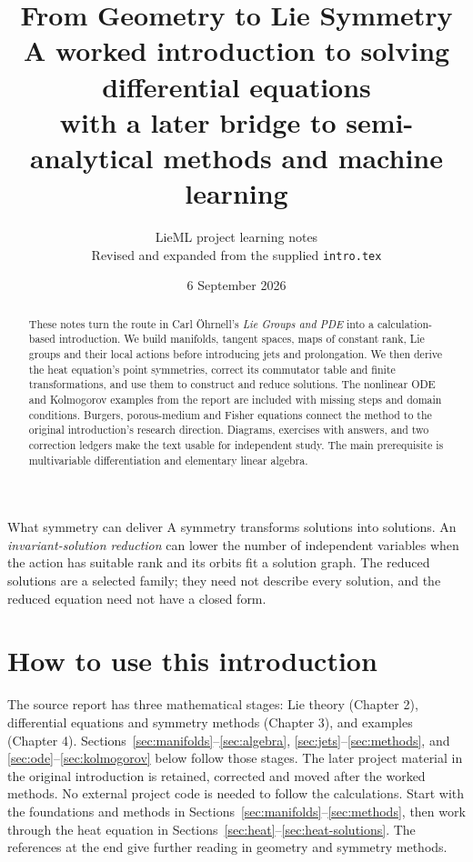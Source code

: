 \documentclass[11pt,a4paper]{article}
\title{\color{ink}\bfseries From Geometry to Lie Symmetry\\[5pt]\Large A worked introduction to solving differential equations\\[7pt]\large with a later bridge to semi-analytical methods and machine learning}
\author{LieML project learning notes\\\small Revised and expanded from the supplied \texttt{intro.tex}}
\date{6 September 2026}
\numberwithin{equation}{section}
\theoremstyle{definition}
\theoremstyle{plain}
\theoremstyle{remark}
\begin{document}
\maketitle
\begin{abstract}
These notes turn the route in Carl \"Ohrnell's \emph{Lie Groups and PDE} into a calculation-based introduction. We build manifolds, tangent spaces, maps of constant rank, Lie groups and their local actions before introducing jets and prolongation. We then derive the heat equation's point symmetries, correct its commutator table and finite transformations, and use them to construct and reduce solutions. The nonlinear ODE and Kolmogorov examples from the report are included with missing steps and domain conditions. Burgers, porous-medium and Fisher equations connect the method to the original introduction's research direction. Diagrams, exercises with answers, and two correction ledgers make the text usable for independent study. The main prerequisite is multivariable differentiation and elementary linear algebra.
\end{abstract}
\begin{idea}{What symmetry can deliver}
A symmetry transforms solutions into solutions. An \emph{invariant-solution reduction} can lower the number of independent variables when the action has suitable rank and its orbits fit a solution graph. The reduced solutions are a selected family; they need not describe every solution, and the reduced equation need not have a closed form.
\end{idea}
\clearpage
{\small\setlength{\parskip}{0pt}\tableofcontents}
\clearpage

\section{How to use this introduction}\label{sec:route}
The source report has three mathematical stages: Lie theory (Chapter 2), differential equations and symmetry methods (Chapter 3), and examples (Chapter 4). Sections~\ref{sec:manifolds}--\ref{sec:algebra}, \ref{sec:jets}--\ref{sec:methods}, and \ref{sec:ode}--\ref{sec:kolmogorov} below follow those stages. The later project material in the original introduction is retained, corrected and moved after the worked methods. No external project code is needed to follow the calculations. Start with the foundations and methods in Sections~\ref{sec:manifolds}--\ref{sec:methods}, then work through the heat equation in Sections~\ref{sec:heat}--\ref{sec:heat-solutions}. The references at the end give further reading in geometry and symmetry methods.
\end{document}
